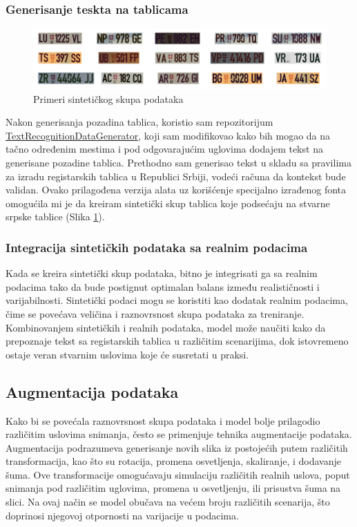 \documentclass[a4paper,12pt]{article}
\begin{document}
	\subsubsection{Generisanje teskta na tablicama}
	\begin{figure}[H]
		\centering
		\includegraphics[width=\textwidth]{assets/synthetic-license-plates.png}
		\caption{Primeri sintetičkog skupa podataka}
		\label{fig:synthetic-license-plates}
	\end{figure}
	
	Nakon generisanja pozadina tablica, koristio sam repozitorijum \href{https://github.com/Belval/TextRecognitionDataGenerator}{TextRecognitionDataGenerator}, koji sam modifikovao kako bih mogao da na tačno određenim mestima i pod odgovarajućim uglovima dodajem tekst na generisane pozadine tablica. Prethodno sam generisao tekst u skladu sa pravilima za izradu registarskih tablica u Republici Srbiji, vodeći računa da kontekst bude validan. Ovako prilagođena verzija alata uz korišćenje specijalno izrađenog fonta omogućila mi je da kreiram sintetički skup tablica koje podsećaju na stvarne srpske tablice (Slika \ref{fig:synthetic-license-plates}).
	
	\subsubsection{Integracija sintetičkih podataka sa realnim podacima}
	Kada se kreira sintetički skup podataka, bitno je integrisati ga sa realnim podacima tako da bude postignut optimalan balans između realističnosti i varijabilnosti. Sintetički podaci mogu se koristiti kao dodatak realnim podacima, čime se povećava veličina i raznovrsnost skupa podataka za treniranje. Kombinovanjem sintetičkih i realnih podataka, model može naučiti kako da prepoznaje tekst sa registarskih tablica u različitim scenarijima, dok istovremeno ostaje veran stvarnim uslovima koje će susretati u praksi.
	
	\subsection{Augmentacija podataka}
	Kako bi se povećala raznovrsnost skupa podataka i model bolje prilagodio različitim uslovima snimanja, često se primenjuje tehnika augmentacije podataka. Augmentacija podrazumeva generisanje novih slika iz postojećih putem različitih transformacija, kao što su rotacija, promena osvetljenja, skaliranje, i dodavanje šuma. Ove transformacije omogućavaju simulaciju različitih realnih uslova, poput snimanja pod različitim uglovima, promena u osvetljenju, ili prisustva šuma na slici. Na ovaj način se model obučava na većem broju različitih scenarija, što doprinosi njegovoj otpornosti na varijacije u podacima.
	
\end{document}
